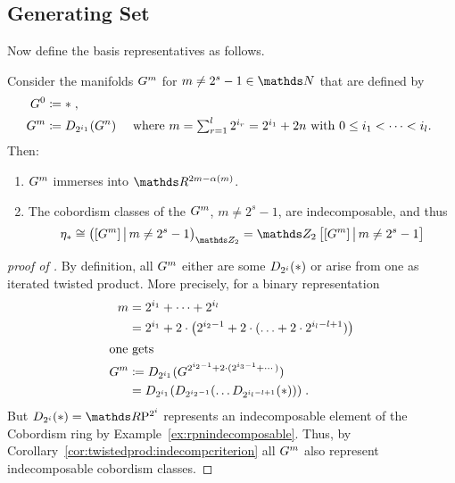 \subsection{Generating Set}
Now define the basis representatives as follows.
\begin{Thm}\label{thm:brownproof}
  Consider the manifolds $G^{m}$ for $m\neq 2^s-1\in\Nat$ that are
  defined by
  \begin{align*}
    G^{0} &\coloneqq * \;, \\
    G^{m} &\coloneqq D_{2^{i_1}}({G^{n}})
        &\text{
          where
          $\textstyle m=\sum_{r=1}^l 2^{i_r}=2^{i_1}+2n$
          with $0\leq i_1<\dotsb<i_l$.
          }
  \end{align*}
  Then:
  \begin{enumerate}
  \item\label{item:brownimmersionproperty}
    $G^{m}$ immerses into $\R^{2m-\alpha(m)}$.
  \item\label{item:indecomposabilityproperty}
    The cobordism classes of the $G^{m}$, $m\neq 2^s-1$, are
    indecomposable, and thus
    \begin{gather*}
      \c_*\cong \left( [\G m] \,\big|\, m\neq 2^s-1 \right)_{\Zmod2}
      = \Zmod2\left[[\G m] \,\big|\, m\neq 2^s-1\right]
    \end{gather*}
  \end{enumerate}
\end{Thm}
\begin{proof}[proof of
  ]
  By definition, all $G^{m}$ either are some $D_{2^i}({*})$
  or arise from one as iterated twisted product. More precisely, for a binary
  representation
  \begin{align*}
    m &= 2^{i_1}+\dotsb + 2^{i_l} \\
      &= 2^{i_1}+ 2\cdot\big( 2^{i_2-1} + 2\cdot(\dotsc + 2\cdot 2^{i_l-l+1})\big)
    \\\intertext{one gets}
    G^{m} &\coloneqq
           D_{2^{i_1}}({G^{2^{i_2-1} + 2\cdot(2^{i_3-1}+\dotsb)}})\\
      &= D_{2^{i_1}}({
        D_{2^{i_2-1}}({
        \dotsc
        D_{2^{i_l-l+1}}({*})
        })})
        \;.
  \end{align*}
  But $\Twistedprod{2^{i}}{\pt}=\RP{2^i}$ represents an indecomposable
  element of the Cobordism ring by Example~\autoref{ex:rpnindecomposable}.
  Thus, by Corollary~\autoref{cor:twistedprod:indecompcriterion} all
  $G^{m}$ also represent indecomposable cobordism classes.
\end{proof}
